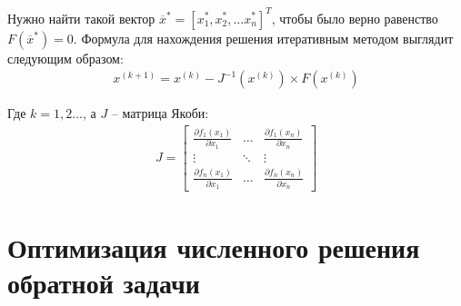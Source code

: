Нужно найти такой вектор $ \overline{x}^*=[x_1^*, x_2^*, \dots x_n^*]^T $, чтобы было верно равенство $ F(\overline{x}^*) = 0 $. Формула для нахождения решения итеративным методом выглядит следующим образом:
\begin{align*}
    x^{(k+1)}=x^{(k)}-J^{-1}(x^{(k)}) \times F(x^{(k)})
\end{align*}

\noindent Где $ k=1,2\dots $, а $ J $ -- матрица Якоби:
\begin{align*}
    J = \begin{bmatrix}
        \frac{\partial f_1(x_1)}{\partial x_1} & \dots & \frac{\partial f_1(x_n)}{\partial x_n} \\
        \vdots & \ddots & \vdots \\
        \frac{\partial f_n(x_1)}{\partial x_1} & \dots & \frac{\partial f_n(x_n)}{\partial x_n}
    \end{bmatrix}
\end{align*}

\section{Оптимизация численного решения обратной задачи}